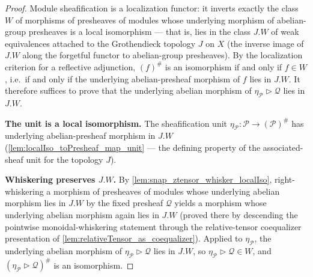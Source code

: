 \begin{proof}
    \leanok
  Module sheafification is a localization functor: it inverts exactly the class
  \(W\) of morphisms of presheaves of modules whose underlying morphism of
  abelian-group presheaves is a local isomorphism --- that is, lies in the class
  \(J.W\) of weak equivalences attached to the Grothendieck topology \(J\) on
  \(X\) (the inverse image of \(J.W\) along the forgetful functor to
  abelian-group presheaves). By the localization criterion for a reflective
  adjunction, \((f)^{\#}\) is an isomorphism if and only if \(f \in W\), i.e.\
  if and only if the underlying abelian-presheaf morphism of \(f\) lies in
  \(J.W\). It therefore suffices to prove that the underlying abelian morphism
  of \(\eta_{\mathcal{P}} \rhd \mathcal{Q}\) lies in \(J.W\).

  \textbf{The unit is a local isomorphism.} The sheafification unit
  \(\eta_{\mathcal{P}} : \mathcal{P} \to (\mathcal{P})^{\#}\) has underlying
  abelian-presheaf morphism in \(J.W\)
  (\cref{lem:localIso_toPresheaf_map_unit} — the defining property of the
  associated-sheaf unit for the topology \(J\)).

  \textbf{Whiskering preserves \(J.W\).} By
  \cref{lem:snap_ztensor_whisker_localIso}, right-whiskering a morphism of
  presheaves of modules whose underlying abelian morphism lies in \(J.W\) by
  the fixed presheaf \(\mathcal{Q}\) yields a morphism whose underlying
  abelian morphism again lies in \(J.W\) (proved there by descending the
  pointwise monoidal-whiskering statement through the relative-tensor
  coequalizer presentation of
  \cref{lem:relativeTensor_as_coequalizer}). Applied to
  \(\eta_{\mathcal{P}}\), the underlying abelian morphism of
  \(\eta_{\mathcal{P}} \rhd \mathcal{Q}\) lies in \(J.W\), so
  \(\eta_{\mathcal{P}} \rhd \mathcal{Q} \in W\), and
  \((\eta_{\mathcal{P}} \rhd \mathcal{Q})^{\#}\) is an isomorphism.
\end{proof}



